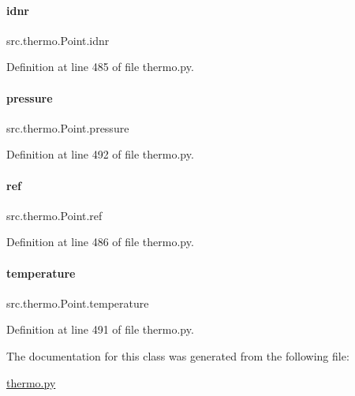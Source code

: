 \paragraph{\texorpdfstring{idnr}{idnr}}
{\footnotesize\ttfamily src.\+thermo.\+Point.\+idnr}



Definition at line 485 of file thermo.\+py.

\mbox{\label{classsrc_1_1thermo_1_1Point_a0c1946b31c49f730423633f2ebb187a5}} 
\paragraph{\texorpdfstring{pressure}{pressure}}
{\footnotesize\ttfamily src.\+thermo.\+Point.\+pressure}



Definition at line 492 of file thermo.\+py.

\mbox{\label{classsrc_1_1thermo_1_1Point_abcf478485471b7f7ad61b7bcd0784e07}} 
\paragraph{\texorpdfstring{ref}{ref}}
{\footnotesize\ttfamily src.\+thermo.\+Point.\+ref}



Definition at line 486 of file thermo.\+py.

\mbox{\label{classsrc_1_1thermo_1_1Point_a8f760387fad2b278aa16425b73763df3}} 
\paragraph{\texorpdfstring{temperature}{temperature}}
{\footnotesize\ttfamily src.\+thermo.\+Point.\+temperature}



Definition at line 491 of file thermo.\+py.



The documentation for this class was generated from the following file\+:\begin{DoxyCompactItemize}
\item 
\hyperlink{thermo_8py}{thermo.\+py}\end{DoxyCompactItemize}

